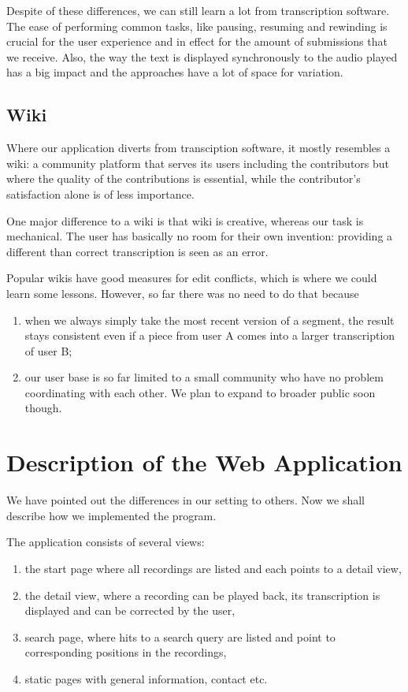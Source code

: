 \documentclass{svproc}
\begin{document}
\vspace{5mm}

Despite of these differences, we can still learn a lot from transcription
software. The ease of performing common tasks, like pausing, resuming and
rewinding is crucial for the user experience and in effect for the amount of
submissions that we receive. Also, the way the text is displayed synchronously
to the audio played has a big impact and the approaches have a lot of space for
variation.

\subsection{Wiki}

Where our application diverts from transciption software, it mostly resembles a
wiki: a community platform that serves its users including the contributors but
where the quality of the contributions is essential, while the contributor's
satisfaction alone is of less importance.

One major difference to a wiki is that wiki is creative, whereas our task is
mechanical. The user has basically no room for their own invention: providing a
different than correct transcription is seen as an error.

Popular wikis have good measures for edit conflicts, which is where we could
learn some lessons. However, so far there was no need to do that because
\begin{enumerate}
\item{when we always simply take the most recent version
of a segment, the result stays consistent even if a piece from user A comes into
a larger transcription of user B;}
\item{our user base is so far limited to a small community who have no problem
coordinating with each other. We plan to expand to broader public soon though.}
\end{enumerate}

\section{Description of the Web Application}

We have pointed out the differences in our setting to others. Now we shall
describe how we implemented the program.

The application consists of several views:
\begin{enumerate}
\item{the start page where all recordings are listed and each points to a detail
view,}
\item{the detail view, where a recording can be played back, its transcription
is displayed and can be corrected by the user,}
\item{search page, where hits to a search query are listed and point to
corresponding positions in the recordings,}
\item{static pages with general information, contact etc.}
\end{enumerate}
\end{document}
